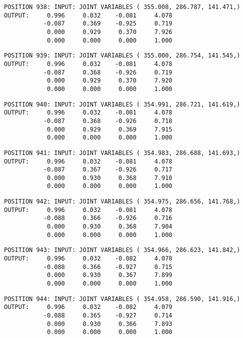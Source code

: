 \begin{verbatim}
POSITION 938: INPUT: JOINT VARIABLES ( 355.008, 286.787, 141.471,)
OUTPUT:     0.996     0.032    -0.081     4.078
           -0.087     0.369    -0.925     0.719
            0.000     0.929     0.370     7.926
            0.000     0.000     0.000     1.000
\end{verbatim} \pagebreak[1]\begin{verbatim}
POSITION 939: INPUT: JOINT VARIABLES ( 355.000, 286.754, 141.545,)
OUTPUT:     0.996     0.032    -0.081     4.078
           -0.087     0.368    -0.926     0.719
            0.000     0.929     0.370     7.920
            0.000     0.000     0.000     1.000
\end{verbatim} \pagebreak[1]\begin{verbatim}
POSITION 940: INPUT: JOINT VARIABLES ( 354.991, 286.721, 141.619,)
OUTPUT:     0.996     0.032    -0.081     4.078
           -0.087     0.368    -0.926     0.718
            0.000     0.929     0.369     7.915
            0.000     0.000     0.000     1.000
\end{verbatim} \pagebreak[1]\begin{verbatim}
POSITION 941: INPUT: JOINT VARIABLES ( 354.983, 286.688, 141.693,)
OUTPUT:     0.996     0.032    -0.081     4.078
           -0.087     0.367    -0.926     0.717
            0.000     0.930     0.368     7.910
            0.000     0.000     0.000     1.000
\end{verbatim} \pagebreak[1]\begin{verbatim}
POSITION 942: INPUT: JOINT VARIABLES ( 354.975, 286.656, 141.768,)
OUTPUT:     0.996     0.032    -0.081     4.078
           -0.088     0.366    -0.926     0.716
            0.000     0.930     0.368     7.904
            0.000     0.000     0.000     1.000
\end{verbatim} \pagebreak[1]\begin{verbatim}
POSITION 943: INPUT: JOINT VARIABLES ( 354.966, 286.623, 141.842,)
OUTPUT:     0.996     0.032    -0.082     4.078
           -0.088     0.366    -0.927     0.715
            0.000     0.930     0.367     7.899
            0.000     0.000     0.000     1.000
\end{verbatim} \pagebreak[1]\begin{verbatim}
POSITION 944: INPUT: JOINT VARIABLES ( 354.958, 286.590, 141.916,)
OUTPUT:     0.996     0.032    -0.082     4.079
           -0.088     0.365    -0.927     0.714
            0.000     0.930     0.366     7.893
            0.000     0.000     0.000     1.000
\end{verbatim} \pagebreak[1]\begin{verbatim}

\end{verbatim}
